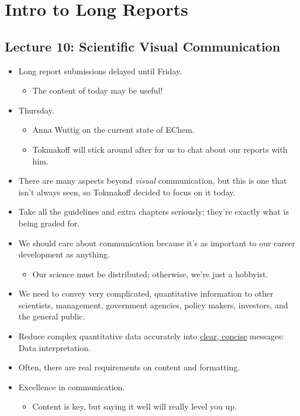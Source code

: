 \documentclass[../notes.tex]{subfiles}
\begin{document}
\chapter{Intro to Long Reports}
\section{Lecture 10: Scientific Visual Communication}
\begin{itemize}
    \item {}Long report submissions delayed until Friday.
    \begin{itemize}
        \item The content of today may be useful!
    \end{itemize}
    \item Thursday.
    \begin{itemize}
        \item Anna Wuttig on the current state of EChem.
        \item Tokmakoff will stick around after for us to chat about our reports with him.
    \end{itemize}
    \item There are many aspects beyond \emph{visual} communication, but this is one that isn't always seen, so Tokmakoff decided to focus on it today.
    \item Take all the guidelines and extra chapters seriously; they're exactly what is being graded for.
    \item We should care about communication because it's as important to our career development as anything.
    \begin{itemize}
        \item Our science must be distributed; otherwise, we're just a hobbyist.
    \end{itemize}
    \item We need to convey very complicated, quantitative information to other scientists, management, government agencies, policy makers, investors, and the general public.
    \item Reduce complex quantitative data accurately into \underline{clear, concise} messages: Data interpretation.
    \item Often, there are real requirements on content and formatting.
    \item Excellence in communication.
    \begin{itemize}
        \item Content is key, but saying it well will really level you up.

\end{itemize}
\end{itemize}
\end{document}
